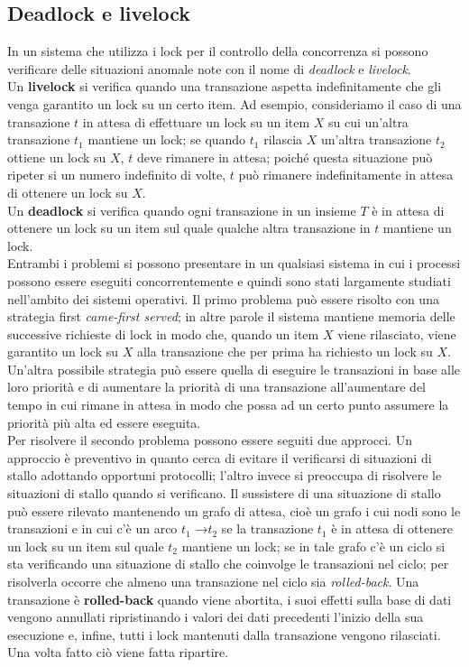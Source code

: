 \subsection{Deadlock e livelock}
In un sistema che utilizza i lock per il controllo della concorrenza si possono verificare delle
situazioni anomale note con il nome di \emph{deadlock} e \emph{livelock}.\\
Un \textbf{livelock} si verifica quando una transazione aspetta indefinitamente che gli venga garantito un
lock su un certo item. Ad esempio, consideriamo il caso di una transazione $t$ in attesa di effettuare
un lock su un item $X$ su cui un'altra transazione $t_1$ mantiene un lock; se quando $t_1$ rilascia $X$
un'altra transazione $t_2$ ottiene un lock su $X$, $t$ deve rimanere in attesa; poiché questa situazione può
ripeter si un numero indefinito di volte, $t$ può rimanere indefinitamente in attesa di ottenere un lock
su $X$.\\
Un \textbf{deadlock} si verifica quando ogni transazione in un insieme $T$ è in attesa di ottenere un lock su
un item sul quale qualche altra transazione in $t$ mantiene un lock.\\
Entrambi i problemi si possono presentare in un qualsiasi sistema in cui i processi possono essere
eseguiti concorrentemente e quindi sono stati largamente studiati nell'ambito dei sistemi operativi.
Il primo problema può essere risolto con una strategia first \emph{came-first served}; in altre parole il
sistema mantiene memoria delle successive richieste di lock in modo che, quando un item $X$ viene
rilasciato, viene garantito un lock su $X$ alla transazione che per prima ha richiesto un lock su $X$.
Un'altra possibile strategia può essere quella di eseguire le transazioni in base alle loro priorità e di
aumentare la priorità di una transazione all'aumentare del tempo in cui rimane in attesa in modo che
possa ad un certo punto assumere la priorità più alta ed essere eseguita.\\
Per risolvere il secondo problema possono essere seguiti due approcci. Un approccio è preventivo in
quanto cerca di evitare il verificarsi di situazioni di stallo adottando opportuni protocolli; l'altro
invece si preoccupa di risolvere le situazioni di stallo quando si verificano. Il sussistere di una
situazione di stallo può essere rilevato mantenendo un grafo di attesa, cioè un grafo i cui nodi sono
le transazioni e in cui c'è un arco $t_1$ →$t_2$ se la transazione $t_1$ è in attesa di ottenere un lock su un
item sul quale $t_2$ mantiene un lock; se in tale grafo c'è un ciclo si sta verificando una situazione di
stallo che coinvolge le transazioni nel ciclo; per risolverla occorre che almeno una transazione nel
ciclo sia \emph{rolled-back}. Una transazione è \textbf{rolled-back} quando viene abortita, 
i suoi effetti sulla base di dati vengono annullati ripristinando i valori dei dati precedenti 
l'inizio della sua esecuzione e, infine, tutti i lock mantenuti dalla transazione vengono rilasciati.
Una volta fatto ciò viene fatta ripartire.

